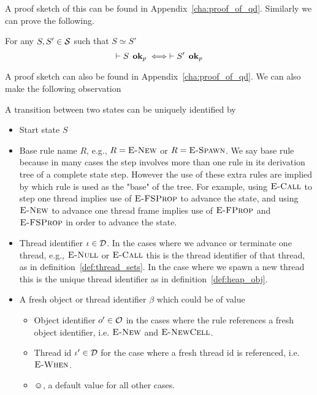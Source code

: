A proof sketch of this can be found in Appendix~\ref{cha:proof_of_qd}.
Similarly we can prove the following. 
\begin{proposition} \label{prop:eqrel_stateok}
  For any $S, S' \in \mathcal{S}$ such that $S \simeq S'$
  \begin{equation}
    \vdash S \:\: \mbox{{\bf ok}$_p$} \iff \vdash S' \:\: \mbox{{\bf ok}$_p$}
  \end{equation}
\end{proposition}
A proof sketch can also be found in Appendix~\ref{cha:proof_of_qd}.
We can also make the following observation
\begin{claim}
  A transition between two states can be uniquely identified by
  \begin{itemize}
    \item Start state $S$
    \item Base rule name $R$, e.g., $R = \mbox{{\sc E-New}}$ or $R = \mbox{\sc E-Spawn}$. We say base rule
      because in many cases the step involves more than one rule in its
      derivation tree of a complete state step. However the use of these extra
      rules are implied by which rule is used as the "base" of the tree. For
      example, using $\mbox{\sc E-Call}$ to step one thread implies use of $\mbox{\sc E-FSProp}$ to
      advance the state, and using $\mbox{{\sc E-New}}$ to advance one thread frame implies
      use of $\mbox{\sc E-FProp}$ and $\mbox{\sc E-FSProp}$ in order to advance the state.
    \item Thread identifier $\iota \in \mathcal{D}$. In the cases where we advance or terminate
      one thread, e.g., $\mbox{{\sc E-Null}}$ or $\mbox{\sc E-Call}$ this is the thread identifier of
      that thread, as in definition~\ref{def:thread_sets}. In the case where we
      spawn a new thread this is the unique thread identifier as in
      definition~\ref{def:heap_obj}.
    \item A fresh object or thread identifier $\beta$ which could be of value
      \begin{itemize}
        \item Object identifier $o' \in \mathcal{O}$ in the cases where the rule
          references a fresh object identifier, i.e. $\mbox{{\sc E-New}}$ and $\mbox{{\sc E-NewCell}}$.
        \item Thread id $\iota' \in \mathcal{D}$ for the case where a fresh thread id is
          referenced, i.e. $\mbox{{\sc E-When}}$.
        \item $\smiley$, a default value for all other cases.
      \end{itemize}
  \end{itemize}
\end{claim}

